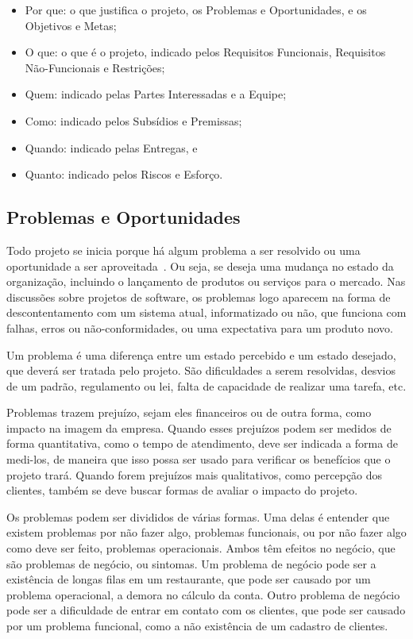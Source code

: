 \documentclass[fontsize=12pt, a4paper,pagesize=auto,toc=listof, ,twoside,chapterprefix=false,appendixprefix=true,open=right]{scrbook}
\begin{document}
\begin{itemize}
    \item Por que: o que justifica o projeto, os Problemas e Oportunidades, e os Objetivos e Metas;
    \item O que: o que é o projeto, indicado pelos Requisitos Funcionais, Requisitos Não-Funcionais e Restrições;
    \item Quem: indicado pelas Partes Interessadas e a Equipe;
    \item Como: indicado pelos Subsídios e Premissas;
    \item Quando: indicado pelas Entregas, e
    \item Quanto: indicado pelos Riscos e Esforço.
\end{itemize}

\subsection{Problemas e Oportunidades}

Todo projeto se inicia porque há algum problema a ser resolvido ou uma oportunidade a ser aproveitada~\citep{semat:1p2,kerzner:12ed}.
Ou seja, se deseja uma mudança no estado da organização, incluindo o lançamento de produtos ou serviços para o mercado.
Nas discussões sobre projetos de software, os problemas logo aparecem na forma de descontentamento com um sistema atual, informatizado ou não, que funciona com falhas, erros ou não-conformidades, ou uma expectativa para um produto novo.

Um problema é uma diferença entre um estado percebido e um estado desejado, que deverá ser tratada pelo projeto.
São dificuldades a serem resolvidas, desvios de um padrão, regulamento ou lei, falta de capacidade de realizar uma tarefa, etc.

Problemas trazem prejuízo, sejam eles financeiros ou de outra forma, como impacto na imagem da empresa.
Quando esses prejuízos podem ser medidos de forma quantitativa, como o tempo de atendimento, deve ser indicada a forma de medi-los, de maneira que isso possa ser usado para verificar os benefícios que o projeto trará.
Quando forem prejuízos mais qualitativos, como percepção dos clientes, também se deve buscar formas de avaliar o impacto do projeto.

Os problemas podem ser divididos de várias formas. Uma delas é entender que existem problemas por não fazer algo, problemas funcionais, ou por não fazer algo como deve ser feito, problemas operacionais.
Ambos têm efeitos no negócio, que são problemas de negócio, ou sintomas.
Um problema de negócio pode ser a existência de longas filas em um restaurante, que pode ser causado por um problema operacional, a demora no cálculo da conta.
Outro problema de negócio pode ser a dificuldade de entrar em contato com os clientes, que pode ser causado por um problema funcional, como a não existência de um cadastro de clientes.
\end{document}
